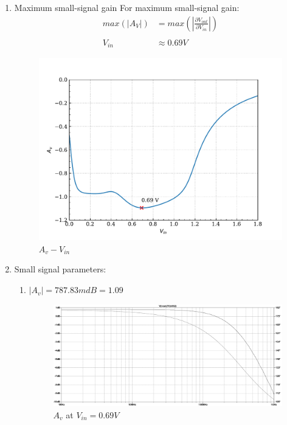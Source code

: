 \documentclass{article}
\begin{document}
\begin{enumerate}
\item Maximum small-signal gain
For maximum small-signal gain:
\begin{equation*}
\begin{align}
max(|A_{V}|) &= max(|\frac{\partial{V_{out}}}{\partial{V_{in}}}|) \\
\\
V_{in} &\approx 0.69 V
\end{align}
\end{equation*}
\begin{figure}[H]
\centering
\includegraphics[width=.9\linewidth]{img/q7/c/cir1-d-vout.pdf}
\caption{\label{fig:cir1-dvout}\(A_{v}-V_{in}\)}
\end{figure}
\item Small signal parameters:
\begin{enumerate}
\item \(|A_{v}| = 787.83mdB = 1.09\)
\begin{figure}[H]
\centering
\includegraphics[width=.9\linewidth]{img/q7/d/cir1-gain.pdf}
\caption{\label{fig:cir1-gain}\(A_{v}\) at \(V_{in} = 0.69V\)}
\end{figure}


\end{enumerate}
\end{enumerate}
\end{document}
